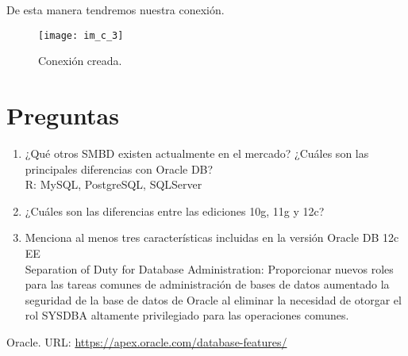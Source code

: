 \documentclass[10pt]{article}
\begin{document}
	De esta manera tendremos nuestra conexión.
	\begin{figure}[H]
		\centering
	\texttt{[image: im\_c\_3]}
	\caption{Conexión creada.}
    \end{figure}
	
	\section{Preguntas}
	\begin{enumerate}
		\item ¿Qué otros SMBD existen actualmente en el mercado? ¿Cuáles son las principales diferencias con Oracle DB?\\
		R: MySQL, PostgreSQL, SQLServer
        \item ¿Cuáles son las diferencias entre las ediciones 10g, 11g y 12c?\\
        \item Menciona al menos tres características incluidas en la versión Oracle DB 12c EE\\
	Separation of Duty for Database Administration: Proporcionar nuevos roles para las tareas comunes de administración de bases de         datos aumentado la seguridad de la base de datos de Oracle al eliminar la necesidad de otorgar el rol SYSDBA altamente privilegiado para las operaciones comunes.
	\end{enumerate}

\begin{thebibliography}{}
	\bibitem{}Oracle. URL: \url{https://apex.oracle.com/database-features/}
\end{thebibliography}

 
\end{document}
